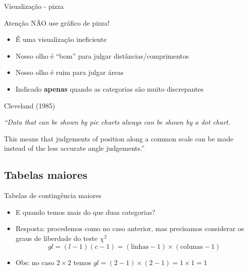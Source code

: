 \documentclass{beamer}
\begin{document}
\begin{frame}{\scriptsize Visualização - pizza}
  \begin{block}{Atenção}
    NÃO use gráfico de pizza!
  \end{block}
  \begin{itemize}
    \footnotesize
  \item É uma visualização ineficiente
  \item Nosso olho é ``bom'' para julgar distâncias/comprimentos
  \item Nosso olho é ruim para julgar áreas
  \item Indicado {\bf apenas} quando as categorias são muito discrepantes
  \end{itemize}
  \begin{block}{Cleveland (1985)}
    \small
    {\em ``Data that can be shown by pie charts always can be shown by a dot chart.

      \bigskip
      This means that judgements of position along a common scale can be made instead of the less accurate angle judgements.''}
  \end{block}
\end{frame}

\subsection{Tabelas maiores}

\begin{frame}{\scriptsize Tabelas de contingência maiores}
  \small
  \begin{itemize}
    \footnotesize
  \item E quando temos mais do que duas categorias?
    \bigskip
  \item Resposta: procedemos como no caso anterior, mas precisamos
    considerar os \alert{graus de liberdade} do teste $\chi^2$
    \begin{displaymath}
        gl = (l-1)(c-1) = (\text{linhas} -1)\times (\text{colunas}-1)
    \end{displaymath}
    \bigskip
  \item Obs: no caso $2 \times 2$ temos $gl = (2-1) \times (2-1)=1
    \times 1 = 1$
  \end{itemize}
\end{frame}

\end{document}
